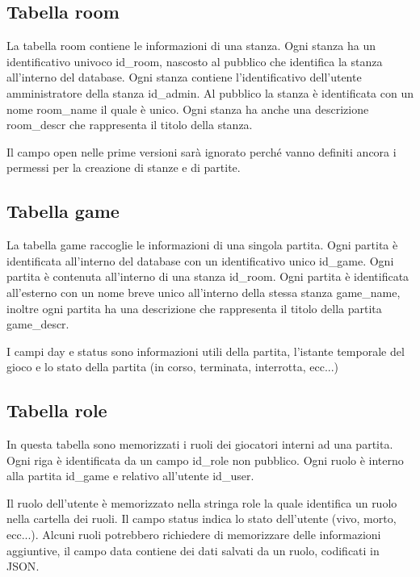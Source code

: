 \documentclass[10pt,a4paper]{article}
\begin{document}
\subsection{Tabella room}
La tabella \textsf{room} contiene le informazioni di una stanza. Ogni stanza ha un identificativo univoco \textsf{id\_room}, nascosto al pubblico che identifica la stanza all'interno del database. Ogni stanza contiene l'identificativo dell'utente amministratore della stanza \textsf{id\_admin}. Al pubblico la stanza è identificata con un nome \textsf{room\_name} il quale è unico. Ogni stanza ha anche una descrizione \textsf{room\_descr} che rappresenta il titolo della stanza. 

Il campo \textsf{open} nelle prime versioni sarà ignorato perché vanno definiti ancora i permessi per la creazione di stanze e di partite.

\subsection{Tabella game}
La tabella game raccoglie le informazioni di una singola partita. Ogni partita è identificata all'interno del database con un identificativo unico \textsf{id\_game}. Ogni partita è contenuta all'interno di una stanza \textsf{id\_room}. Ogni partita è identificata all'esterno con un nome breve unico all'interno della stessa stanza \textsf{game\_name}, inoltre ogni partita ha una descrizione che rappresenta il titolo della partita \textsf{game\_descr}.

I campi \textsf{day} e \textsf{status} sono informazioni utili della partita, l'istante temporale del gioco e lo stato della partita (in corso, terminata, interrotta, ecc...)

\subsection{Tabella role}
In questa tabella sono memorizzati i ruoli dei giocatori interni ad una partita. Ogni riga è identificata da un campo \textsf{id\_role} non pubblico. Ogni ruolo è interno alla partita \textsf{id\_game} e relativo all'utente \textsf{id\_user}. 

Il ruolo dell'utente è memorizzato nella stringa \textsf{role} la quale identifica un ruolo nella cartella dei ruoli. Il campo \textsf{status} indica lo stato dell'utente (vivo, morto, ecc...). Alcuni ruoli potrebbero richiedere di memorizzare delle informazioni aggiuntive, il campo \textsf{data} contiene dei dati salvati da un ruolo, codificati in \textsf{JSON}.
\end{document}
